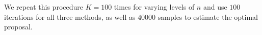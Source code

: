 We repeat this procedure $K=100$ times for varying levels of $n$ and use $100$ iterations for all three methods, as well as $\num{40000}$ samples to estimate the optimal proposal.